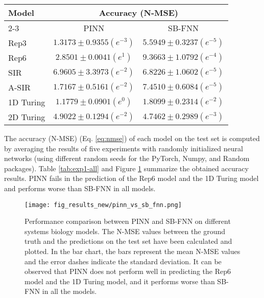 \begin{table*}[!htb]
\centering
\small
\caption[Performance comparison between PINN and SB-FNN on different systems biology models] {Performance comparison between PINN and SB-FNN on different systems biology models.}
\label{tab:exp1-all}
\begin{tabular}{ l cc } 
\toprule
\multirow{2}{*}{Model} & \multicolumn{2}{c}{Accuracy (N-MSE)} \\
\cmidrule(l){2-3} 
 & PINN & SB-FNN\\
\midrule 
\midrule 
{Rep3} & $1.3173 \pm 0.9355 (e^{-3})$ & $5.5949 \pm 0.3237 (e^{-5})$ \\
{Rep6} & $2.8501 \pm 0.0041 (e^{1})$ & $9.3663 \pm 1.0792 (e^{-4})$ \\
{SIR} & $6.9605 \pm 3.3973 (e^{-2})$ & $6.8226 \pm 1.0602 (e^{-5})$ \\
{A-SIR} & $1.7167 \pm 0.5161 (e^{-2})$ & $7.4510 \pm 0.6084 (e^{-5})$ \\
{1D Turing} & $1.1779 \pm 0.0901 (e^{0})$ & $1.8099 \pm 0.2314 (e^{-2})$ \\
{2D Turing} & $4.9022 \pm 0.1294 (e^{-2})$ & $4.7462 \pm 0.2989 (e^{-3})$ \\
\bottomrule
\end{tabular}
\end{table*}

The accuracy (N-MSE) (Eq. \ref{eq:nmse}) of each model on the test set is computed by averaging the results of five experiments with randomly initialized neural networks (using different random seeds for the PyTorch, Numpy, and Random packages). 
Table \ref{tab:exp1-all} and Figure \ref{fig:pinn_vs_sb_fnn} summarize the obtained accuracy results. PINN fails in the prediction of the Rep6 model and the 1D Turing model and performs worse than SB-FNN in all models.

\begin{figure}[h]
\centering
\texttt{[image: fig\_results\_new/pinn\_vs\_sb\_fnn.png]}
\caption[Performance comparison between PINN and SB-FNN on different systems biology models] {Performance comparison between PINN and SB-FNN on different systems biology models. The N-MSE values between the ground truth and the predictions on the test set have been calculated and plotted. In the bar chart, the bars represent the mean N-MSE values and the error dashes indicate the standard deviation. It can be observed that PINN does not perform well in predicting the Rep6 model and the 1D Turing model, and it performs worse than SB-FNN in all the models.}
\label{fig:pinn_vs_sb_fnn}
\end{figure}

